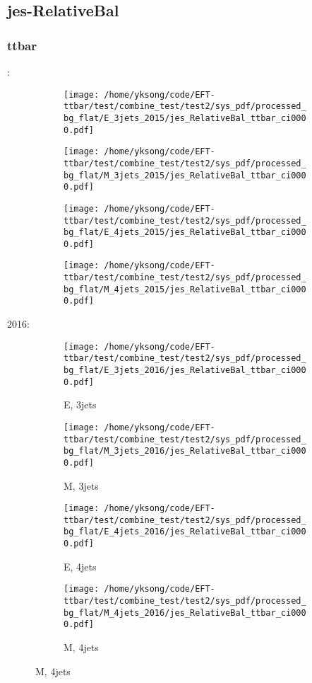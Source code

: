 \documentclass{beamer}
\begin{document}
\subsection{jes-RelativeBal}

\begin{frame}
\frametitle{ttbar}
\fontsize{5}{1}:
\begin{figure}
\centering
\begin{subfigure}[b]{0.24\textwidth}
\texttt{[image: /home/yksong/code/EFT-ttbar/test/combine\_test/test2/sys\_pdf/processed\_bg\_flat/E\_3jets\_2015/jes\_RelativeBal\_ttbar\_ci0000.pdf]}
\end{subfigure}
\begin{subfigure}[b]{0.24\textwidth}
\texttt{[image: /home/yksong/code/EFT-ttbar/test/combine\_test/test2/sys\_pdf/processed\_bg\_flat/M\_3jets\_2015/jes\_RelativeBal\_ttbar\_ci0000.pdf]}
\end{subfigure}
\begin{subfigure}[b]{0.24\textwidth}
\texttt{[image: /home/yksong/code/EFT-ttbar/test/combine\_test/test2/sys\_pdf/processed\_bg\_flat/E\_4jets\_2015/jes\_RelativeBal\_ttbar\_ci0000.pdf]}
\end{subfigure}
\begin{subfigure}[b]{0.24\textwidth}
\texttt{[image: /home/yksong/code/EFT-ttbar/test/combine\_test/test2/sys\_pdf/processed\_bg\_flat/M\_4jets\_2015/jes\_RelativeBal\_ttbar\_ci0000.pdf]}
\end{subfigure}
\end{figure}
2016:
\begin{figure}
\centering
\begin{subfigure}[b]{0.24\textwidth}
\texttt{[image: /home/yksong/code/EFT-ttbar/test/combine\_test/test2/sys\_pdf/processed\_bg\_flat/E\_3jets\_2016/jes\_RelativeBal\_ttbar\_ci0000.pdf]}
\captionsetup{font=tiny}
\caption{E, 3jets}
\end{subfigure}
\begin{subfigure}[b]{0.24\textwidth}
\texttt{[image: /home/yksong/code/EFT-ttbar/test/combine\_test/test2/sys\_pdf/processed\_bg\_flat/M\_3jets\_2016/jes\_RelativeBal\_ttbar\_ci0000.pdf]}
\captionsetup{font=tiny}
\caption{M, 3jets}
\end{subfigure}
\begin{subfigure}[b]{0.24\textwidth}
\texttt{[image: /home/yksong/code/EFT-ttbar/test/combine\_test/test2/sys\_pdf/processed\_bg\_flat/E\_4jets\_2016/jes\_RelativeBal\_ttbar\_ci0000.pdf]}
\captionsetup{font=tiny}
\caption{E, 4jets}
\end{subfigure}
\begin{subfigure}[b]{0.24\textwidth}
\texttt{[image: /home/yksong/code/EFT-ttbar/test/combine\_test/test2/sys\_pdf/processed\_bg\_flat/M\_4jets\_2016/jes\_RelativeBal\_ttbar\_ci0000.pdf]}
\captionsetup{font=tiny}
\caption{M, 4jets}
\end{subfigure}
\end{figure}
\end{frame}
\end{document}
